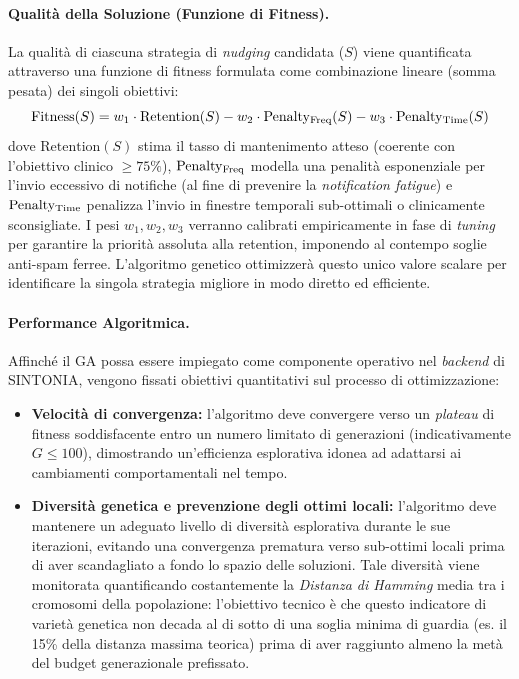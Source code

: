 \paragraph{Qualità della Soluzione (Funzione di Fitness).}
La qualità di ciascuna strategia di \textit{nudging} candidata ($S$) viene quantificata attraverso una funzione di fitness formulata come combinazione lineare (somma pesata) dei singoli obiettivi:
\[
    \text{Fitness}(S) = w_1 \cdot \text{Retention}(S) - w_2 \cdot \text{Penalty\textsubscript{Freq}}(S) - w_3 \cdot \text{Penalty\textsubscript{Time}}(S)
\]
dove $\text{Retention}(S)$ stima il tasso di mantenimento atteso (coerente con l'obiettivo clinico $\geq 75\%$), $\text{Penalty\textsubscript{Freq}}$ modella una penalità esponenziale per l'invio eccessivo di notifiche (al fine di prevenire la \textit{notification fatigue}) e $\text{Penalty\textsubscript{Time}}$ penalizza l'invio in finestre temporali sub-ottimali o clinicamente sconsigliate. I pesi $w_1, w_2, w_3$ verranno calibrati empiricamente in fase di \textit{tuning} per garantire la priorità assoluta alla retention, imponendo al contempo soglie anti-spam ferree. L'algoritmo genetico ottimizzerà questo unico valore scalare per identificare la singola strategia migliore in modo diretto ed efficiente.

\paragraph{Performance Algoritmica.}
Affinché il GA possa essere impiegato come componente operativo nel \textit{backend} di SINTONIA, vengono fissati obiettivi quantitativi sul processo di ottimizzazione:
\begin{itemize}
    \item \textbf{Velocità di convergenza:} l'algoritmo deve convergere verso un \textit{plateau} di fitness soddisfacente entro un numero limitato di generazioni (indicativamente $G \leq 100$), dimostrando un'efficienza esplorativa idonea ad adattarsi ai cambiamenti comportamentali nel tempo.
    \item \textbf{Diversità genetica e prevenzione degli ottimi locali:} l'algoritmo deve mantenere un adeguato livello di diversità esplorativa durante le sue iterazioni, evitando una convergenza prematura verso sub-ottimi locali prima di aver scandagliato a fondo lo spazio delle soluzioni. Tale diversità viene monitorata quantificando costantemente la \textit{Distanza di Hamming} media tra i cromosomi della popolazione: l'obiettivo tecnico è che questo indicatore di varietà genetica non decada al di sotto di una soglia minima di guardia (es. il 15\% della distanza massima teorica) prima di aver raggiunto almeno la metà del budget generazionale prefissato.
\end{itemize}

